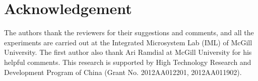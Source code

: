 \documentclass[10pt,journal]{IEEEtran}
\begin{document}
\section*{Acknowledgement}
The authors thank the reviewers for their suggestions and comments, and all the experiments are carried out at the Integrated Microsystem Lab (IML) of McGill University. The first author also thank Ari Ramdial at McGill University for his helpful comments. This research is supported by High Technology Research and Development Program of China (Grant No. 2012AA012201, 2012AA011902).



\end{document}
